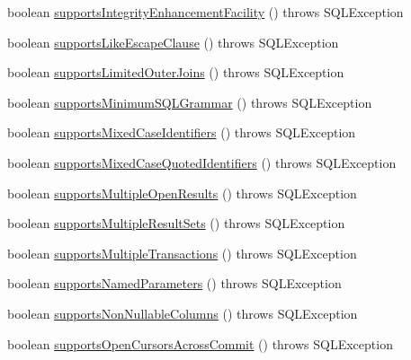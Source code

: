 \begin{DoxyCompactItemize}
\item 
boolean \mbox{\hyperlink{classcom_1_1mysql_1_1cj_1_1jdbc_1_1_database_meta_data_a05da0f08a0671d0ec87699253795a717}{supports\+Integrity\+Enhancement\+Facility}} ()  throws S\+Q\+L\+Exception 
\item 
boolean \mbox{\hyperlink{classcom_1_1mysql_1_1cj_1_1jdbc_1_1_database_meta_data_af183fff36d3a59d863a2b46c54b89faf}{supports\+Like\+Escape\+Clause}} ()  throws S\+Q\+L\+Exception 
\item 
boolean \mbox{\hyperlink{classcom_1_1mysql_1_1cj_1_1jdbc_1_1_database_meta_data_ab68ca8f6a12d726396eb248f8b8ccce0}{supports\+Limited\+Outer\+Joins}} ()  throws S\+Q\+L\+Exception 
\item 
boolean \mbox{\hyperlink{classcom_1_1mysql_1_1cj_1_1jdbc_1_1_database_meta_data_a7dae04c8f5efcb5694f7d51e15c5deb5}{supports\+Minimum\+S\+Q\+L\+Grammar}} ()  throws S\+Q\+L\+Exception 
\item 
boolean \mbox{\hyperlink{classcom_1_1mysql_1_1cj_1_1jdbc_1_1_database_meta_data_af9e1b9edcaf35b135c9fb44aaa03f99a}{supports\+Mixed\+Case\+Identifiers}} ()  throws S\+Q\+L\+Exception 
\item 
boolean \mbox{\hyperlink{classcom_1_1mysql_1_1cj_1_1jdbc_1_1_database_meta_data_ac7f546c53a94116455183e4d16331940}{supports\+Mixed\+Case\+Quoted\+Identifiers}} ()  throws S\+Q\+L\+Exception 
\item 
boolean \mbox{\hyperlink{classcom_1_1mysql_1_1cj_1_1jdbc_1_1_database_meta_data_a347d467d5e02962df8782b6b3b1f56d6}{supports\+Multiple\+Open\+Results}} ()  throws S\+Q\+L\+Exception 
\item 
boolean \mbox{\hyperlink{classcom_1_1mysql_1_1cj_1_1jdbc_1_1_database_meta_data_ac2598c637493e0cc7ca5f5cb1c1c464f}{supports\+Multiple\+Result\+Sets}} ()  throws S\+Q\+L\+Exception 
\item 
boolean \mbox{\hyperlink{classcom_1_1mysql_1_1cj_1_1jdbc_1_1_database_meta_data_a18865768002c7d7527f714e7ebf39f27}{supports\+Multiple\+Transactions}} ()  throws S\+Q\+L\+Exception 
\item 
boolean \mbox{\hyperlink{classcom_1_1mysql_1_1cj_1_1jdbc_1_1_database_meta_data_a277857cdcf18defc8af079da8368b0b2}{supports\+Named\+Parameters}} ()  throws S\+Q\+L\+Exception 
\item 
boolean \mbox{\hyperlink{classcom_1_1mysql_1_1cj_1_1jdbc_1_1_database_meta_data_ac93acbd1e24b19de7e90e19cf61218a6}{supports\+Non\+Nullable\+Columns}} ()  throws S\+Q\+L\+Exception 
\item 
boolean \mbox{\hyperlink{classcom_1_1mysql_1_1cj_1_1jdbc_1_1_database_meta_data_a3b76cdd70d934791899e12a59e365a10}{supports\+Open\+Cursors\+Across\+Commit}} ()  throws S\+Q\+L\+Exception 

\end{DoxyCompactItemize}
